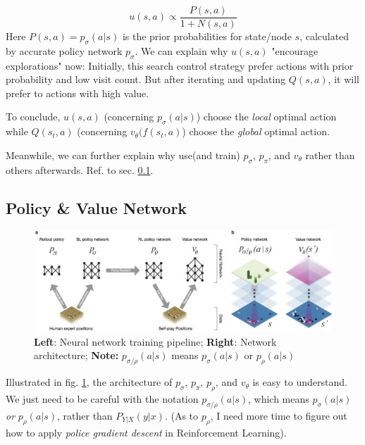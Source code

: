 \documentclass{mcmthesis}
\begin{document}
\begin{equation}
	u(s,a)\propto \frac{P(s,a)}{1+N(s,a)}
\end{equation}
Here $P(s,a)=p_\sigma(a|s)$ is the prior probabilities for state/node $s$, calculated by accurate policy network $p_\sigma$. We can explain why $u(s,a)$ "encourage explorations" now: Initially, this search control strategy prefer actions with prior probability and low visit count. But after iterating and updating $Q(s,a)$, it will prefer to actions with high value.

 
To conclude, $u(s,a)$ (concerning $p_\sigma(a|s)$) choose the \textit{local} optimal action while $Q(s_t,a)$ (concerning $v_\theta(f(s_t,a)$) choose the \textit{global} optimal action.


Meanwhile, we can further explain why use(and train) $p_\sigma$, $p_\pi$, and $v_\theta$ rather than others afterwards. Ref. to sec. \ref{sec2}.


\subsection{Policy \& Value Network}\label{sec2}
\begin{figure}[]
	\centering
	\includegraphics[width=.8\columnwidth]{./fig1.jpg}
	\caption[network]{\textbf{Left}: Neural network training pipeline; \textbf{Right}: Network architecture; 
	\textbf{Note:} $p_{\sigma/\rho}(a|s) $ means $p_\sigma(a|s)$ or $p_\rho(a|s)$}\label{fig1}
\end{figure}
Illustrated in fig. \ref{fig1}, the architecture of $p_\sigma$, $p_\pi$, $p_\rho$, and $v_\theta$ is easy to understand. We just need  to be careful with the notation $p_{\sigma/\rho}(a|s) $, which means  $p_\sigma(a|s)$ \textit{or} $p_\rho(a|s)$, rather than $P_{Y|X}(y|x)$. (As to $p_\rho$, I  need more  time to figure out how to apply \textit{police gradient descent} in Reinforcement Learning). 
\end{document}
